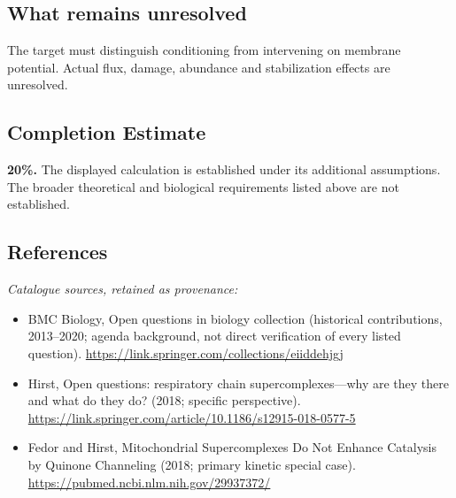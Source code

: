 \documentclass[11pt]{article}
\begin{document}
\subsection{What remains unresolved}
The target must distinguish conditioning from intervening on membrane potential. Actual flux, damage, abundance and stabilization effects are unresolved.
\subsection{Completion Estimate}
\textbf{20\%.} The displayed calculation is established under its additional assumptions. The broader theoretical and biological requirements listed above are not established.
\subsection{References}
\noindent\emph{Catalogue sources, retained as provenance:}
\begin{itemize}
\item BMC Biology, Open questions in biology collection (historical contributions, 2013--2020; agenda background, not direct verification of every listed question). \url{https://link.springer.com/collections/eiiddehjgj}
\item Hirst, Open questions: respiratory chain supercomplexes---why are they there and what do they do? (2018; specific perspective). \url{https://link.springer.com/article/10.1186/s12915-018-0577-5}
\item Fedor and Hirst, Mitochondrial Supercomplexes Do Not Enhance Catalysis by Quinone Channeling (2018; primary kinetic special case). \url{https://pubmed.ncbi.nlm.nih.gov/29937372/}
\end{itemize}
\clearpage


\appendix
\end{document}
